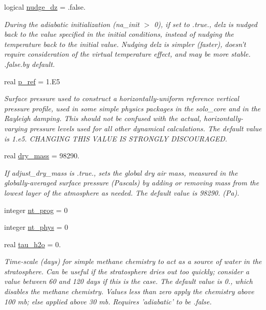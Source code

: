 \begin{DoxyCompactItemize}
logical \hyperlink{structfv__arrays__mod_1_1fv__flags__type_a71234b57511aa08b1ddba1ef5c7a9c47}{nudge\-\_\-dz} = .false.
\begin{DoxyCompactList}\small\item\em During the adiabatic initialization (na\-\_\-init $>$ 0), if set to .true., delz is nudged back to the value specified in the initial conditions, instead of nudging the temperature back to the initial value. Nudging delz is simpler (faster), doesn’t require consideration of the virtual temperature effect, and may be more stable. .false.\-by default. \end{DoxyCompactList}\item 
real \hyperlink{structfv__arrays__mod_1_1fv__flags__type_acd2a77017fb1e32fc2a931b0458eb135}{p\-\_\-ref} = 1.E5
\begin{DoxyCompactList}\small\item\em Surface pressure used to construct a horizontally-\/uniform reference vertical pressure profile, used in some simple physics packages in the solo\-\_\-core and in the Rayleigh damping. This should not be confused with the actual, horizontally-\/varying pressure levels used for all other dynamical calculations. The default value is 1.\-e5. C\-H\-A\-N\-G\-I\-N\-G T\-H\-I\-S V\-A\-L\-U\-E I\-S S\-T\-R\-O\-N\-G\-L\-Y D\-I\-S\-C\-O\-U\-R\-A\-G\-E\-D. \end{DoxyCompactList}\item 
real \hyperlink{structfv__arrays__mod_1_1fv__flags__type_aa20cbdfdf995bbe333674d614490ef07}{dry\-\_\-mass} = 98290.
\begin{DoxyCompactList}\small\item\em If adjust\-\_\-dry\-\_\-mass is .true., sets the global dry air mass, measured in the globally-\/averaged surface pressure (Pascals) by adding or removing mass from the lowest layer of the atmosphere as needed. The default value is 98290. (Pa). \end{DoxyCompactList}\item 
integer \hyperlink{structfv__arrays__mod_1_1fv__flags__type_a567ce430887199ba62b515cef02229cb}{nt\-\_\-prog} = 0
\item 
integer \hyperlink{structfv__arrays__mod_1_1fv__flags__type_a968a2c7340ea986e3418793dcafb3810}{nt\-\_\-phys} = 0
\item 
real \hyperlink{structfv__arrays__mod_1_1fv__flags__type_af9fe4497904cedded7039fb1444c80f3}{tau\-\_\-h2o} = 0.
\begin{DoxyCompactList}\small\item\em Time-\/scale (days) for simple methane chemistry to act as a source of water in the stratosphere. Can be useful if the stratosphere dries out too quickly; consider a value between 60 and 120 days if this is the case. The default value is 0., which disables the methane chemistry. Values less than zero apply the chemistry above 100 mb; else applied above 30 mb. Requires 'adiabatic' to be .false. \end{DoxyCompactList}\item 

\end{DoxyCompactItemize}
